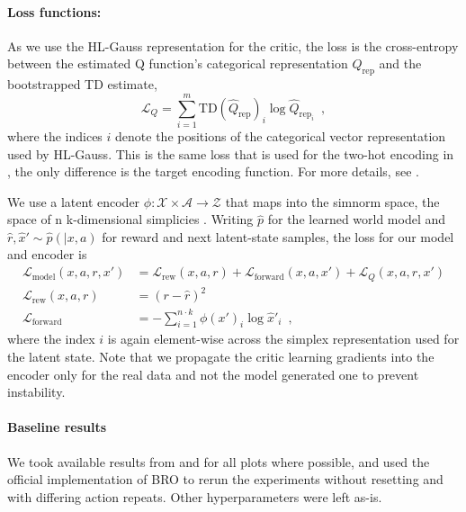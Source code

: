 \paragraph{Loss functions:} As we use the HL-Gauss representation \parencite{farebrother2024stop} for the critic, the loss is the cross-entropy between the estimated Q function's categorical representation $Q_\mathrm{rep}$ and the bootstrapped TD estimate,
$$\mathcal{L}_Q = \sum_{i=1}^m {\mathrm{TD}(\hat{Q}_\mathrm{rep})}_i \log \hat{Q}_{\mathrm{rep}_i}\enspace,$$
where the indices $i$ denote the positions of the categorical vector representation used by HL-Gauss.
This is the same loss that is used for the two-hot encoding in \textcite{hansen2024tdmpc}, the only difference is the target encoding function.
For more details, see \textcite{farebrother2024stop}.

We use a latent encoder $\phi: \mathcal{X} \times \mathcal{A} \rightarrow \mathcal{Z}$ that maps into the simnorm space, the space of n k-dimensional simplicies \parencite{lavoie2023simplicial}.
Writing $\hat{p}$ for the learned world model and \mbox{$\hat{r}, \hat{x}' \sim \hat{p}(|x,a)$} for reward and next latent-state samples, the loss for our model and encoder is
\begin{align}
    \mathcal{L}_\mathrm{model}(x,a,r,x') &= \mathcal{L}_\mathrm{rew}(x,a,r) + \mathcal{L}_\mathrm{forward}(x,a,x') + \mathcal{L}_Q(x,a,r,x')\\
    \mathcal{L}_\mathrm{rew}(x,a,r) &= \left( r - \hat{r} \right)^2 \\
    \mathcal{L}_\mathrm{forward} &= - \sum_{i=1}^{n \cdot k} \phi(x')_i \log \hat{x}'_i\enspace,
\end{align}
where the index $i$ is again element-wise across the simplex representation used for the latent state.
Note that we propagate the critic learning gradients into the encoder only for the real data and not the model generated one to prevent instability.

\paragraph{Baseline results}
We took available results from \textcite{nauman2024bigger} and \textcite{hansen2024tdmpc} for all plots where possible, and used the official implementation of BRO to rerun the experiments without resetting and with differing action repeats. 
Other hyperparameters were left as-is.

\label{app:setup}



